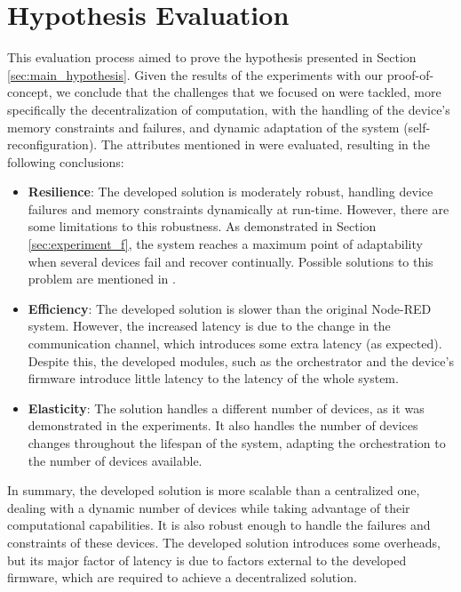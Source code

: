 \section{Hypothesis Evaluation}\label{sec:evaluation_hypothesis}

This evaluation process aimed to prove the hypothesis presented in Section \ref{sec:main_hypothesis}. Given the results of the experiments with our proof-of-concept, we conclude that the challenges that we focused on were tackled, more specifically the decentralization of computation, with the handling of the device's memory constraints and failures, and dynamic adaptation of the system (self-reconfiguration). The attributes mentioned in  were evaluated, resulting in the following conclusions:

\begin{itemize}
    \item \textbf{Resilience}: The developed solution is moderately robust, handling device failures and memory constraints dynamically at run-time. However, there are some limitations to this robustness. As demonstrated in Section \ref{sec:experiment_f}, the system reaches a maximum point of adaptability when several devices fail and recover continually. Possible solutions to this problem are mentioned in .
    \item \textbf{Efficiency}: The developed solution is slower than the original Node-RED system. However, the increased latency is due to the change in the communication channel, which introduces some extra latency (as expected). Despite this, the developed modules, such as the orchestrator and the device's firmware introduce little latency to the latency of the whole system.
    \item \textbf{Elasticity}: The solution handles a different number of devices, as it was demonstrated in the experiments. It also handles the number of devices changes throughout the lifespan of the system, adapting the orchestration to the number of devices available.
\end{itemize}

In summary, the developed solution is more scalable than a centralized one, dealing with a dynamic number of devices while taking advantage of their computational capabilities. It is also robust enough to handle the failures and constraints of these devices. The developed solution introduces some overheads, but its major factor of latency is due to factors external to the developed firmware, which are required to achieve a decentralized solution.

